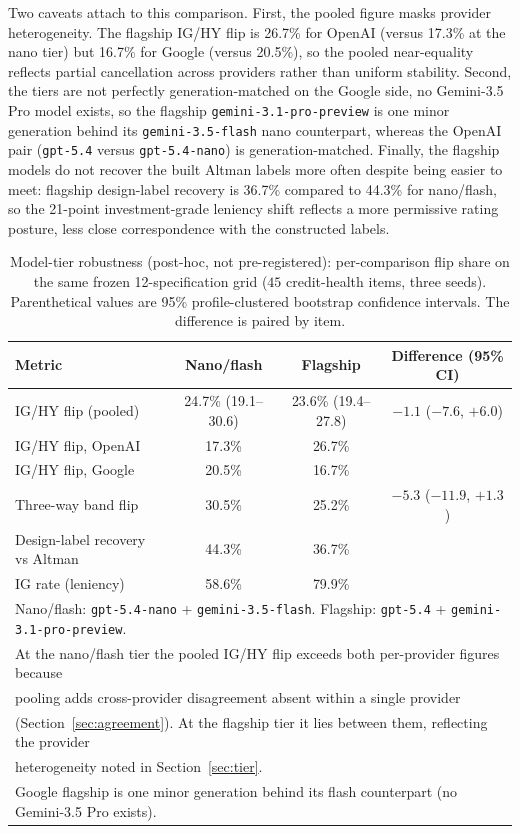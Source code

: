 \documentclass[a4paper,fleqn]{cas-sc}
\begin{document}
Two caveats attach to this comparison. First, the pooled figure masks provider heterogeneity. The flagship IG/HY flip is 26.7\% for OpenAI (versus 17.3\% at the nano tier) but 16.7\% for Google (versus
20.5\%), so the pooled near-equality reflects partial cancellation across providers rather than uniform
stability. Second, the tiers are not perfectly generation-matched on the Google side, no Gemini-3.5 Pro
model exists, so the flagship \texttt{gemini-3.1-pro-preview} is one minor generation behind its
\texttt{gemini-3.5-flash} nano counterpart, whereas the OpenAI pair (\texttt{gpt-5.4} versus
\texttt{gpt-5.4-nano}) is generation-matched. Finally, the flagship models do not recover the built
Altman labels more often despite being easier to meet: flagship design-label recovery is 36.7\% compared to 44.3\% for
nano/flash, so the 21-point investment-grade leniency shift reflects a more permissive rating posture,
less close correspondence with the constructed labels.

\begin{table}[t]\centering
\caption{Model-tier robustness (post-hoc, not pre-registered): per-comparison flip share on the same
frozen 12-specification grid ($45$ credit-health items, three seeds). Parenthetical values are 95\%
profile-clustered bootstrap confidence intervals. The difference is paired by item.}
\label{tab:tier}
\begin{tabular}{lccc}\toprule
Metric & Nano/flash & Flagship & Difference (95\% CI) \\\midrule
IG/HY flip (pooled) & 24.7\% (19.1--30.6) & 23.6\% (19.4--27.8) & $-1.1$ ($-7.6$, $+6.0$) \\
\quad IG/HY flip, OpenAI & 17.3\% & 26.7\% & \\
\quad IG/HY flip, Google & 20.5\% & 16.7\% & \\
Three-way band flip & 30.5\% & 25.2\% & $-5.3$ ($-11.9$, $+1.3$) \\\midrule
Design-label recovery vs Altman & 44.3\% & 36.7\% & \\
IG rate (leniency) & 58.6\% & 79.9\% & \\\midrule
\multicolumn{4}{l}{Nano/flash: \texttt{gpt-5.4-nano} + \texttt{gemini-3.5-flash}. Flagship: \texttt{gpt-5.4} + \texttt{gemini-3.1-pro-preview}.}\\
\multicolumn{4}{l}{At the nano/flash tier the pooled IG/HY flip exceeds both per-provider figures because}\\
\multicolumn{4}{l}{pooling adds cross-provider disagreement absent within a single provider}\\
\multicolumn{4}{l}{(Section~\ref{sec:agreement}). At the flagship tier it lies between them, reflecting the provider}\\
\multicolumn{4}{l}{heterogeneity noted in Section~\ref{sec:tier}.}\\
\multicolumn{4}{l}{Google flagship is one minor generation behind its flash counterpart (no Gemini-3.5 Pro exists).}\\\bottomrule
\end{tabular}\end{table}
\end{document}
